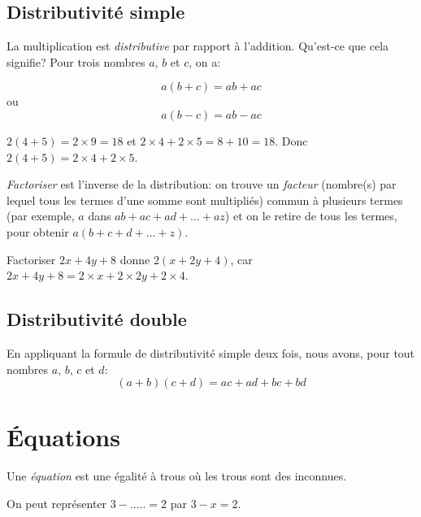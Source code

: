 \subsection{Distributivité simple}

La multiplication est \emph{distributive} par rapport à l'addition. Qu'est-ce que cela signifie? Pour trois nombres $a$, $b$ et $c$, on a:

\begin{equation}
    a(b+c) = ab + ac
\end{equation}
ou
\begin{equation}
    a(b-c) = ab - ac
\end{equation}

\begin{exemple}
    $2(4+5) = 2 \times 9 = 18$ et $2\times 4 + 2\times 5 = 8 + 10 = 18$. Donc $2(4+5) = 2\times 4 + 2\times 5$.
\end{exemple}

\begin{definition}
    \emph{Factoriser} est l'inverse de la distribution: on trouve un \emph{facteur} (nombre(s) par lequel tous les termes d'une somme sont multipliés) commun à plusieurs termes (par exemple, $a$ dans $ab + ac + ad + \dots + az$) et on le retire de tous les termes, pour obtenir $a(b+c+d+\dots+z)$.
\end{definition}

\begin{exemple}
    Factoriser $2x+4y+8$ donne $2(x+2y+4)$, car $2x+4y+8 = 2\times x + 2\times 2y + 2\times 4$.
\end{exemple}

\subsection{Distributivité double}

En appliquant la formule de distributivité simple deux fois, nous avons, pour tout nombres $a$, $b$, $c$ et $d$:
\[
    (a+b)(c+d) = ac + ad + bc + bd
\]

\section{Équations}

\begin{definition}
    Une \emph{équation} est une égalité à trous où les trous sont des inconnues.
\end{definition}
\begin{exemple}
    On peut représenter $3 - ..... = 2$ par $3 - x = 2$.
\end{exemple}

